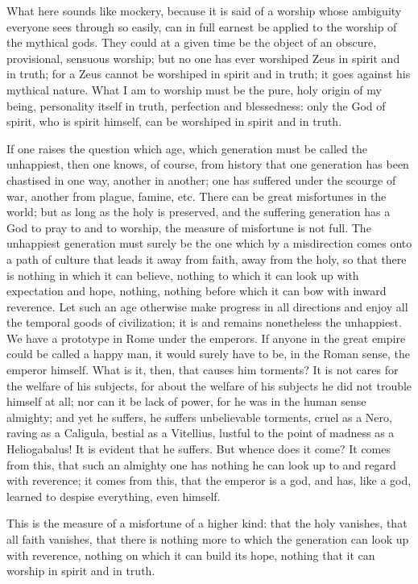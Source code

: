 \documentclass[12pt]{book}
\newcommand{\opage}[1]{\marginnote{\footnotesize\textit{[#1]}}}
\begin{document}
What here sounds like mockery, because it is said of a worship whose
ambiguity everyone sees through so easily, can in full earnest be
applied to the worship of the mythical gods. They could at a given time
be the object of an obscure, provisional, sensuous worship; but no one
has ever worshiped Zeus in spirit and in truth; for a Zeus cannot be
worshiped in spirit and in truth; it goes against his mythical nature.
What I am to worship must be the pure, holy origin of my being,
personality itself in truth, perfection and blessedness: only the God of
spirit, who is spirit himself, can be worshiped in spirit and in truth.

If one raises the question which age, which generation must be called
the unhappiest, then one knows, of course, from history that one
generation has been chastised in one way, another in another; one has
suffered under the scourge of war, another from plague, famine, etc.
There can be great misfortunes in the world; but as long as the holy is
preserved, and the suffering generation has a God to pray to and to
worship, the measure of misfortune is not full. The unhappiest
generation must surely be the one which by a misdirection comes onto a
path of culture that leads it away from faith, away from the holy, so
that there is nothing in which it can believe, nothing to which it can
look up with expectation and hope, nothing, nothing before which it can
bow with inward reverence. Let such an age otherwise make progress in
all directions and enjoy all the temporal goods of civilization; it is
and remains nonetheless the unhappiest. We have a prototype in Rome
under the
\opage{118}\setcounter{footnote}{0}%
emperors. If anyone in the great empire could be called a happy man, it
would surely have to be, in the Roman sense, the emperor himself. What
is it, then, that causes him torments? It is not cares for the welfare
of his subjects, for about the welfare of his subjects he did not
trouble himself at all; nor can it be lack of power, for he was in the
human sense almighty; and yet he suffers, he suffers unbelievable
torments, cruel as a Nero, raving as a Caligula, bestial as a Vitellius,
lustful to the point of madness as a Heliogabalus! It is evident that
he suffers. But whence does it come? It comes from this, that such an
almighty one has nothing he can look up to and regard with reverence; it
comes from this, that the emperor is a god, and has, like a god, learned
to despise everything, even himself.

This is the measure of a misfortune of a higher kind: that the holy
vanishes, that all faith vanishes, that there is nothing more to which
the generation can look up with reverence, nothing on which it can build
its hope, nothing that it can worship in spirit and in truth.
\end{document}
